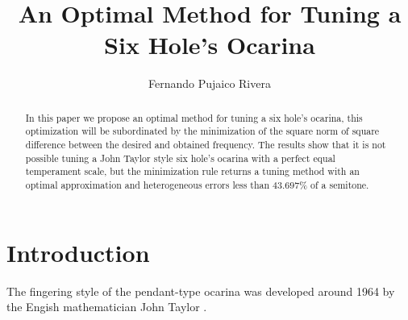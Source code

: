 \documentclass[11pt,twocolumn]{article}
\title{ An Optimal Method for Tuning a Six Hole's Ocarina }
\author{Fernando Pujaico Rivera}
\date{ }
\begin{document}
\maketitle


\begin{abstract}
In this paper we propose an optimal method for tuning a six hole's ocarina,
this optimization will be subordinated by the minimization of 
the square norm of square difference between the desired and obtained frequency.
The results show that it is not possible tuning a John Taylor style six hole's ocarina with a perfect equal temperament scale,
but the minimization rule returns a tuning method with an optimal approximation and heterogeneous errors less than $43.697\%$ of a semitone.
\end{abstract}



\section{Introduction}

The fingering style of the pendant-type ocarina was developed around 1964 
by the Engish mathematician John Taylor \cite[pp. 79]{metropolitan1985american} \cite[pp. 10]{galpin2001newsletter}.

\end{document}
